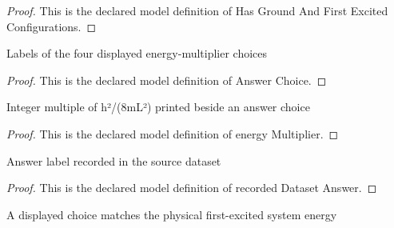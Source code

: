 \begin{proof}
  This is the declared model definition of Has Ground And First Excited Configurations.
\end{proof}
\begin{definition}
  \label{def:physics:phyx-mini-0581:phyxminiproblems-problemphyxmini0581-answerchoice}
  Labels of the four displayed energy-multiplier choices
\end{definition}
\begin{proof}
  This is the declared model definition of Answer Choice.
\end{proof}
\begin{definition}
  \label{def:physics:phyx-mini-0581:phyxminiproblems-problemphyxmini0581-answerchoice-energymultiplier}
  Integer multiple of h²/(8mL²) printed beside an answer choice
\end{definition}
\begin{proof}
  This is the declared model definition of energy Multiplier.
\end{proof}
\begin{definition}
  \label{def:physics:phyx-mini-0581:phyxminiproblems-problemphyxmini0581-recordeddatasetanswer}
  Answer label recorded in the source dataset
\end{definition}
\begin{proof}
  This is the declared model definition of recorded Dataset Answer.
\end{proof}
\begin{definition}
  \label{def:physics:phyx-mini-0581:phyxminiproblems-problemphyxmini0581-matchesdisplayedfirstexcitedenergy}
  A displayed choice matches the physical first-excited system energy
\end{definition}
